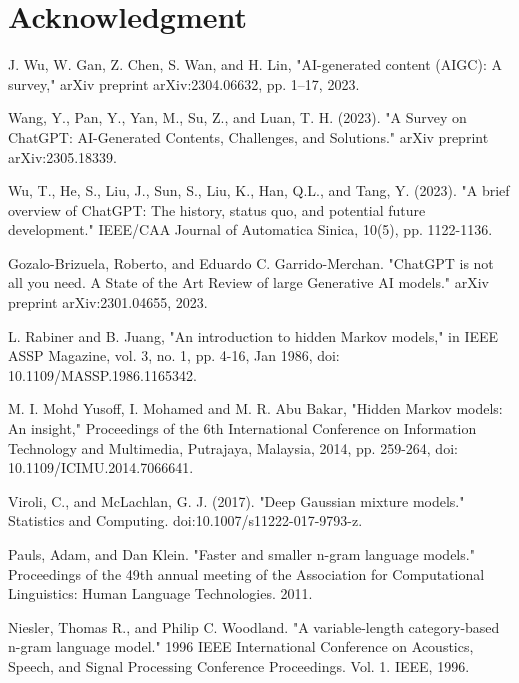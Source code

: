 \documentclass[conference]{IEEEtran}
\begin{document}
\section*{Acknowledgment}





\begin{thebibliography}{00}
 J. Wu, W. Gan, Z. Chen, S. Wan, and H. Lin, "AI-generated content (AIGC): A survey," arXiv preprint arXiv:2304.06632, pp. 1–17, 2023.

 Wang, Y., Pan, Y., Yan, M., Su, Z., and Luan, T. H. (2023). "A Survey on ChatGPT: AI-Generated Contents, Challenges, and Solutions." arXiv preprint arXiv:2305.18339.

 Wu, T., He, S., Liu, J., Sun, S., Liu, K., Han, Q.L., and Tang, Y. (2023). "A brief overview of ChatGPT: The history, status quo, and potential future development." IEEE/CAA Journal of Automatica Sinica, 10(5), pp. 1122-1136.

 Gozalo-Brizuela, Roberto, and Eduardo C. Garrido-Merchan. "ChatGPT is not all you need. A State of the Art Review of large Generative AI models." arXiv preprint arXiv:2301.04655, 2023.

 L. Rabiner and B. Juang, "An introduction to hidden Markov models," in IEEE ASSP Magazine, vol. 3, no. 1, pp. 4-16, Jan 1986, doi: 10.1109/MASSP.1986.1165342.

 M. I. Mohd Yusoff, I. Mohamed and M. R. Abu Bakar, "Hidden Markov models: An insight," Proceedings of the 6th International Conference on Information Technology and Multimedia, Putrajaya, Malaysia, 2014, pp. 259-264, doi: 10.1109/ICIMU.2014.7066641.

 Viroli, C., and McLachlan, G. J. (2017). "Deep Gaussian mixture models." Statistics and Computing. doi:10.1007/s11222-017-9793-z.

 Pauls, Adam, and Dan Klein. "Faster and smaller n-gram language models." Proceedings of the 49th annual meeting of the Association for Computational Linguistics: Human Language Technologies. 2011.

 Niesler, Thomas R., and Philip C. Woodland. "A variable-length category-based n-gram language model." 1996 IEEE International Conference on Acoustics, Speech, and Signal Processing Conference Proceedings. Vol. 1. IEEE, 1996.


\end{thebibliography}
\end{document}
